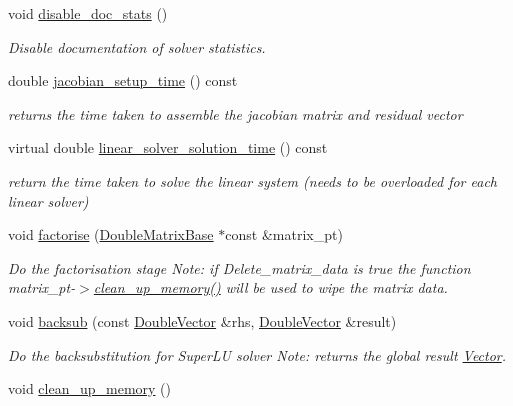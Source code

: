 \begin{DoxyCompactItemize}
void \hyperlink{classoomph_1_1SuperLUSolver_ad4a6f466585f86cbba0b033eb8cda0e4}{disable\+\_\+doc\+\_\+stats} ()
\begin{DoxyCompactList}\small\item\em Disable documentation of solver statistics. \end{DoxyCompactList}\item 
double \hyperlink{classoomph_1_1SuperLUSolver_a9e9bdeac1f619319b931d1dea53a2d96}{jacobian\+\_\+setup\+\_\+time} () const
\begin{DoxyCompactList}\small\item\em returns the time taken to assemble the jacobian matrix and residual vector \end{DoxyCompactList}\item 
virtual double \hyperlink{classoomph_1_1SuperLUSolver_a39e375e5ca81863127fe6d381ef97b65}{linear\+\_\+solver\+\_\+solution\+\_\+time} () const
\begin{DoxyCompactList}\small\item\em return the time taken to solve the linear system (needs to be overloaded for each linear solver) \end{DoxyCompactList}\item 
void \hyperlink{classoomph_1_1SuperLUSolver_a67d7a06fdff48c75736498c7b853d781}{factorise} (\hyperlink{classoomph_1_1DoubleMatrixBase}{Double\+Matrix\+Base} $\ast$const \&matrix\+\_\+pt)
\begin{DoxyCompactList}\small\item\em Do the factorisation stage Note\+: if Delete\+\_\+matrix\+\_\+data is true the function matrix\+\_\+pt-\/$>$\hyperlink{classoomph_1_1SuperLUSolver_aec78b96a8f831a89f9b8fb48b1ce0c68}{clean\+\_\+up\+\_\+memory()} will be used to wipe the matrix data. \end{DoxyCompactList}\item 
void \hyperlink{classoomph_1_1SuperLUSolver_ae9c60b9515bcebc1e0509b7b0e51b5f9}{backsub} (const \hyperlink{classoomph_1_1DoubleVector}{Double\+Vector} \&rhs, \hyperlink{classoomph_1_1DoubleVector}{Double\+Vector} \&result)
\begin{DoxyCompactList}\small\item\em Do the backsubstitution for Super\+LU solver Note\+: returns the global result \hyperlink{classoomph_1_1Vector}{Vector}. \end{DoxyCompactList}\item 
void \hyperlink{classoomph_1_1SuperLUSolver_aec78b96a8f831a89f9b8fb48b1ce0c68}{clean\+\_\+up\+\_\+memory} ()

\end{DoxyCompactItemize}
